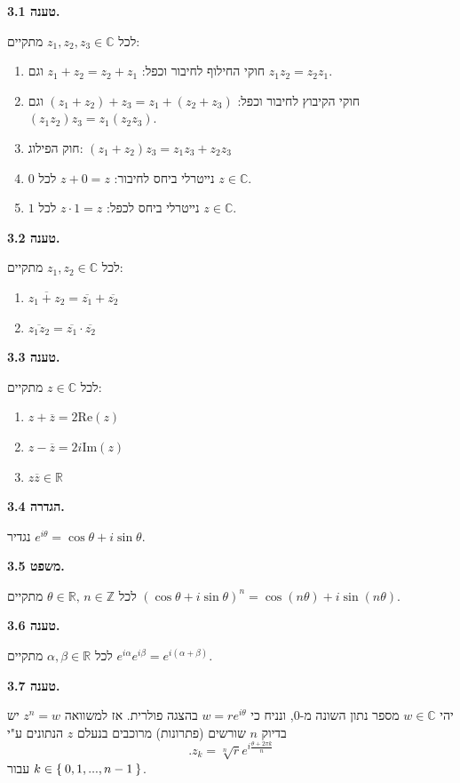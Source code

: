 \documentclass[12pt]{report}
\theoremstyle{plain}
\theoremstyle{definition}
\newcommand{\R}{\mathbb{R}}
\newcommand{\Z}{\mathbb{Z}}
\newcommand{\C}{\mathbb{C}}
\newcommand{\0}{\mathbf{0}}
\begin{document}
\noindent\textbf{טענה 3.1.}

לכל $z_{1},z_{2},z_{3}\in\C$ מתקיים:
\begin{enumerate}[label=\alph*.]

\item חוקי החילוף לחיבור וכפל: $z_{1}+z_{2}=z_{2}+z_{1}$ וגם $z_{1}z_{2}=z_{2}z_{1}$.

\item חוקי הקיבוץ לחיבור וכפל: $(z_{1}+z_{2})+z_{3}=z_{1}+(z_{2}+z_{3})$
וגם $(z_{1}z_{2})z_{3}=z_{1}(z_{2}z_{3})$.

\item חוק הפילוג: $(z_{1}+z_{2})z_{3}=z_{1}z_{3}+z_{2}z_{3}$

\item $0$ נייטרלי ביחס לחיבור: $z+0=z$ לכל $z\in\C$.

\item $1$ נייטרלי ביחס לכפל: $z\cdot1=z$ לכל $z\in\C$.
\end{enumerate}

\bigskip
\bigskip

\noindent\textbf{טענה 3.2.}

לכל
$z_{1},z_{2}\in\C$
מתקיים:
\begin{enumerate}[label=\alph*.]
\item $\overline{z_{1}+z_{2}}=\overline{z_{1}}+\overline{z_{2}}$
\item $\overline{z_{1}z_{2}}=\overline{z_{1}}\cdot\overline{z_{2}}$
\end{enumerate}

\bigskip
\bigskip

\noindent\textbf{טענה 3.3.}

לכל
$z\in\C$
מתקיים:
\begin{enumerate}[label=\alph*.]
\item $z+\overline{z}=2\text{{Re}}(z)$
\item $z-\overline{z}=2i\text{{Im}}(z)$
\item $z\overline{z}\in\R$ 
\end{enumerate}

\bigskip
\bigskip

\noindent\textbf{הגדרה 3.4.}

נגדיר
$e^{i\theta}=\cos\theta+i\sin\theta$.

\bigskip
\bigskip

\noindent\textbf{משפט 3.5.}

לכל
$\theta\in\R,\,n\in\Z$
מתקיים
$(\cos\theta+i\sin\theta)^{n}=\cos(n\theta)+i\sin(n\theta)$.

\bigskip
\bigskip

\noindent\textbf{טענה 3.6.}

לכל
$\alpha,\beta\in\R$
מתקיים
$e^{i\alpha}e^{i\beta}=e^{i(\alpha+\beta)}$.

\bigskip
\bigskip

\noindent\textbf{טענה 3.7.}

יהי
$w\in\C$
מספר נתון השונה מ-$0$, ונניח כי
$w=re^{i\theta}$
בהצגה פולרית. אז למשוואה
$z^n=w$
יש בדיוק 
$n$
שורשים (פתרונות) מרוכבים בנעלם 
$z$
הנתונים ע"י
$$
.z_{k}=\sqrt[n]{r}e^{i\frac{\theta+2\pi k}{n}}
$$
עבור $k\in\Set{0,1,...,n-1}$.

\bigskip
\bigskip
\end{document}
